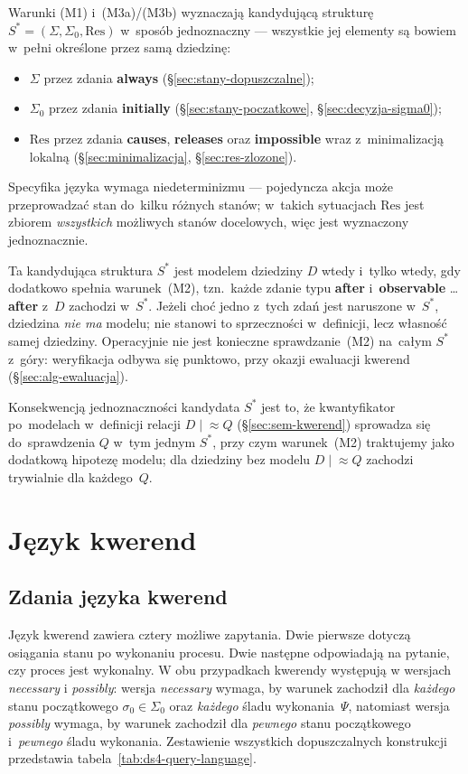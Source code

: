 \documentclass[11pt,a4paper]{article}
\newcommand{\causes}{\textbf{causes}}
\newcommand{\aft}{\textbf{after}}
\newcommand{\initially}{\textbf{initially}}
\newcommand{\always}{\textbf{always}}
\newcommand{\impossible}{\textbf{impossible}}
\newcommand{\releases}{\textbf{releases}}
\newcommand{\observable}{\textbf{observable}}
\theoremstyle{definition}
\begin{document}
Warunki (M1) i~(M3a)/(M3b) wyznaczają kandydującą strukturę $S^\ast = (\Sigma, \Sigma_0, \mathrm{Res})$ w~sposób jednoznaczny --- wszystkie jej elementy są bowiem w~pełni określone przez samą dziedzinę:
\begin{itemize}
  \item $\Sigma$ przez zdania \always{} (§\ref{sec:stany-dopuszczalne});
  \item $\Sigma_0$ przez zdania \initially{} (§\ref{sec:stany-poczatkowe}, §\ref{sec:decyzja-sigma0});
  \item $\mathrm{Res}$ przez zdania \causes{}, \releases{} oraz \impossible{} wraz z~minimalizacją lokalną (§\ref{sec:minimalizacja}, §\ref{sec:res-zlozone}).
\end{itemize}
Specyfika języka wymaga niedeterminizmu --- pojedyncza akcja może przeprowadzać stan do~kilku różnych stanów; w~takich sytuacjach $\mathrm{Res}$ jest zbiorem \emph{wszystkich} możliwych stanów docelowych, więc jest wyznaczony jednoznacznie.

Ta kandydująca struktura $S^\ast$ jest modelem dziedziny $D$ wtedy i~tylko wtedy, gdy dodatkowo spełnia warunek~(M2), tzn.\ każde zdanie typu \aft{} i~\observable{} \ldots{} \aft{} z~$D$ zachodzi w~$S^\ast$. Jeżeli choć jedno z~tych zdań jest naruszone w~$S^\ast$, dziedzina \emph{nie ma} modelu; nie stanowi to sprzeczności w~definicji, lecz własność samej dziedziny. Operacyjnie nie jest konieczne sprawdzanie~(M2) na~całym $S^\ast$ z~góry: weryfikacja odbywa się punktowo, przy okazji ewaluacji kwerend (§\ref{sec:alg-ewaluacja}).

Konsekwencją jednoznaczności kandydata $S^\ast$ jest to, że kwantyfikator po~modelach w~definicji relacji $D \mid\!\approx Q$ (§\ref{sec:sem-kwerend}) sprowadza się do~sprawdzenia $Q$ w~tym jednym $S^\ast$, przy czym warunek~(M2) traktujemy jako dodatkową hipotezę modelu; dla dziedziny bez modelu $D \mid\!\approx Q$ zachodzi trywialnie dla każdego~$Q$.

\section{Język kwerend}
\label{sec:kwerendy}

\subsection{Zdania języka kwerend}

Język kwerend zawiera cztery możliwe zapytania. Dwie pierwsze dotyczą osiągania stanu po wykonaniu procesu. Dwie następne odpowiadają na pytanie, czy proces jest wykonalny. W obu przypadkach kwerendy występują w wersjach \textit{necessary} i \textit{possibly}: wersja \textit{necessary} wymaga, by warunek zachodził dla \emph{każdego} stanu początkowego $\sigma_0 \in \Sigma_0$ oraz \emph{każdego} śladu wykonania~$\Psi$, natomiast wersja \textit{possibly} wymaga, by warunek zachodził dla \emph{pewnego} stanu początkowego i~\emph{pewnego} śladu wykonania. Zestawienie wszystkich dopuszczalnych konstrukcji przedstawia tabela~\ref{tab:ds4-query-language}.
\end{document}
